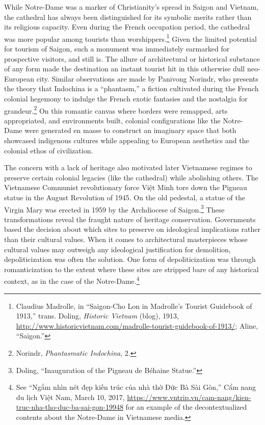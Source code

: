 \vi While Notre-Dame was a marker of Christianity’s spread in Saigon and Vietnam, the cathedral has always been distinguished for its symbolic merits rather than its religious capacity. Even during the French occupation period, the cathedral was more popular among tourists than worshippers.\footnote{Claudius Madrolle, in “Saigon-Cho Lon in Madrolle’s Tourist Guidebook of 1913,” trans. Doling, \textit{Historic Vietnam} (blog), 1913, \url{http://www.historicvietnam.com/madrolle-tourist-guidebook-of-1913/}; Aline, “Saigon.”} Given the limited potential for tourism of Saigon, such a monument was immediately earmarked for prospective visitors, and still is. The allure of architectural or historical substance of any form made the destination an instant tourist hit in this otherwise dull neo-European city. Similar observations are made by Panivong Norindr, who presents the theory that Indochina is a “phantasm,” a fiction cultivated during the French colonial hegemony to indulge the French exotic fantasies and the nostalgia for grandeur.\footnote{Norindr, \textit{Phantasmatic Indochina}, 2.} On this romantic canvas where borders were remapped, arts appropriated, and environments built, colonial configurations like the Notre-Dame were generated en masse to construct an imaginary space that both showcased indigenous cultures while appealing to European aesthetics and the colonial ethos of civilization.

The concern with a lack of heritage also motivated later Vietnamese regimes to preserve certain colonial legacies (like the cathedral) while abolishing others. The Vietnamese Communist revolutionary force Việt Minh tore down the Pigneau statue in the August Revolution of 1945. On the old pedestal, a statue of the Virgin Mary was erected in 1959 by the Archdiocese of Saigon.\footnote{Doling, “Inauguration of the Pigneau de Béhaine Statue.”} These transformations reveal the fraught nature of heritage conservation. Governments based the decision about which sites to preserve on ideological implications rather than their cultural values. When it comes to architectural masterpieces whose cultural values may outweigh any ideological justification for demolition, depoliticization was often the solution. One form of depoliticization was through romanticization to the extent where these sites are stripped bare of any historical context, as in the case of the Notre-Dame.\footnote{See “Ngắm nhìn nét đẹp kiến trúc của nhà thờ Đức Bà Sài Gòn,” Cẩm nang du lịch Việt Nam, March 10, 2017, \url{https://www.vntrip.vn/cam-nang/kien-truc-nha-tho-duc-ba-sai-gon-19948} for an example of the decontextualized contents about the Notre-Dame in Vietnamese media.}

